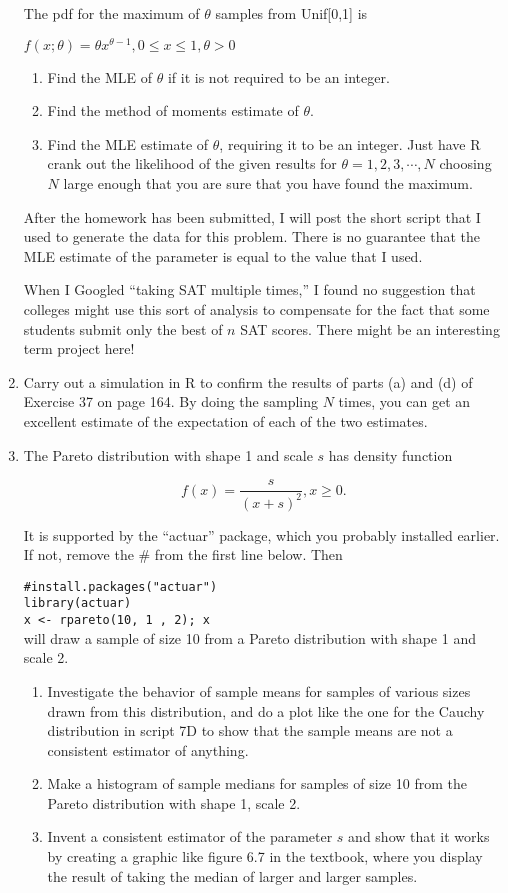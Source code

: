 \documentclass[12pt]{article}
\begin{document}
\begin{enumerate}
The pdf for the maximum of $\theta$ samples from Unif[0,1] is

$f(x; \theta) = \theta x^{\theta - 1}, 0 \leq x \leq 1, \theta > 0$

\begin{enumerate}
\item Find the MLE of $\theta$ if it is not required to be an integer.
\item Find the method of moments estimate of $\theta.$
\item Find the MLE estimate of $\theta$, requiring it to be an integer. Just have R crank out the likelihood of the given results for $\theta = 1, 2, 3, \cdots, N$ choosing $N$ large enough that you are sure that you have found the maximum.
\end{enumerate}

After the homework has been submitted, I will post the short script that I used to generate the data for this problem. There is no guarantee that the MLE estimate of the parameter is equal to the value that I used.

When I Googled ``taking SAT multiple times,'' I found no suggestion that colleges might use this sort of analysis to compensate for the fact that some students submit only the best of $n$ SAT scores. There might be an interesting term project here!

\item Carry out a simulation in R to confirm the results of parts (a) and (d) of Exercise 37 on page 164. By doing the sampling $N$ times, you can get an excellent estimate of the expectation of each of the two estimates.

\item The Pareto distribution with shape 1 and scale $s$ has density function

$$f(x) = \frac{s}{(x+s)^2}, x \geq 0.$$

It is supported by the ``actuar'' package, which you probably installed earlier. If not, remove the \# from the first line below. Then

\verb!#install.packages("actuar")!\\
\verb!library(actuar)!\\
\verb!x <- rpareto(10, 1 , 2); x!\\

will draw a sample of size 10 from a Pareto distribution with shape 1 and scale 2.

\begin{enumerate}
\item Investigate the behavior of sample means for samples of various sizes drawn from this distribution, and do a plot like the one for the Cauchy distribution in script 7D to show that the sample means are not a consistent estimator of anything.
\item Make a histogram of sample medians for samples of size 10 from the Pareto distribution with shape 1, scale 2.
\item Invent a consistent estimator of the parameter $s$ and show that it works by creating a graphic like figure 6.7 in the textbook, where you display the result of taking the median of larger and larger samples.
\end{enumerate}


\end{enumerate}
\end{document}
